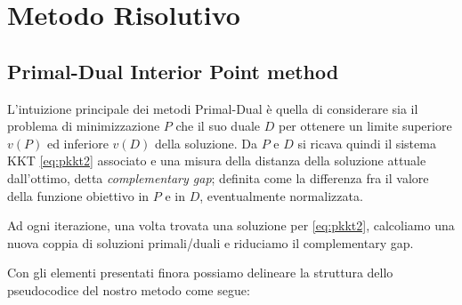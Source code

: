 \section{Metodo Risolutivo}
\subsection{Primal-Dual Interior Point method}
L'intuizione principale dei metodi Primal-Dual è 
quella di considerare sia il problema di minimizzazione
 $P$ che il suo duale $D$ per ottenere un limite 
superiore $v(P)$ ed inferiore $v(D)$ della soluzione.
Da $P$ e $D$ si ricava quindi il sistema KKT \ref{eq:pkkt2} associato e una misura
 della distanza della soluzione attuale dall'ottimo, detta \textit{complementary gap};
  definita come la differenza fra il valore della funzione obiettivo in $P$ e in $D$, eventualmente normalizzata.
  
  Ad ogni iterazione, una volta trovata una soluzione per \ref{eq:pkkt2}, calcoliamo una nuova coppia di soluzioni primali/duali 
  e riduciamo il complementary gap.

  Con gli elementi presentati finora possiamo delineare la struttura dello pseudocodice del nostro metodo come segue:

